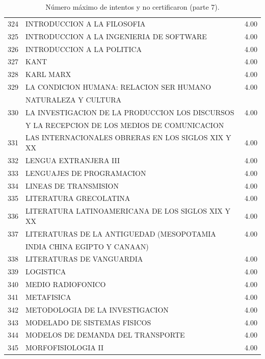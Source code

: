 \documentclass[12pt]{article}
\begin{document}
\begin{table}[ht]
{\begin{tabular}{rlr}
  324 & INTRODUCCION A LA FILOSOFIA & 4.00 \\ 
  325 & INTRODUCCION A LA INGENIERIA DE SOFTWARE & 4.00 \\ 
  326 & INTRODUCCION A LA POLITICA & 4.00 \\ 
  327 & KANT & 4.00 \\ 
  328 & KARL MARX & 4.00 \\ 
  329 & LA CONDICION HUMANA: RELACION SER HUMANO& 4.00 \\
   & NATURALEZA Y CULTURA & \\ 
  330 & LA INVESTIGACION DE LA PRODUCCION LOS DISCURSOS & 4.00 \\ 
  &  Y LA RECEPCION DE LOS MEDIOS DE COMUNICACION &  \\ 
  331 & LAS INTERNACIONALES OBRERAS EN LOS SIGLOS XIX Y XX & 4.00 \\ 
  332 & LENGUA EXTRANJERA III & 4.00 \\ 
  333 & LENGUAJES DE PROGRAMACION & 4.00 \\ 
  334 & LINEAS DE TRANSMISION & 4.00 \\ 
  335 & LITERATURA GRECOLATINA & 4.00 \\ 
  336 & LITERATURA LATINOAMERICANA DE LOS SIGLOS XIX Y XX & 4.00 \\ 
  337 & LITERATURAS DE LA ANTIGUEDAD (MESOPOTAMIA & 4.00 \\ 
   &  INDIA CHINA EGIPTO Y CANAAN) & \\ 
  338 & LITERATURAS DE VANGUARDIA & 4.00 \\ 
  339 & LOGISTICA & 4.00 \\ 
  340 & MEDIO RADIOFONICO & 4.00 \\ 
  341 & METAFISICA & 4.00 \\ 
  342 & METODOLOGIA DE LA INVESTIGACION & 4.00 \\ 
  343 & MODELADO DE SISTEMAS FISICOS & 4.00 \\ 
  344 & MODELOS DE DEMANDA DEL TRANSPORTE & 4.00 \\ 
  345 & MORFOFISIOLOGIA II & 4.00 \\ 
   \hline
\end{tabular}
}\caption{\label{Num_Max_Intentos_Nunca_Cert_7} N\'umero m\'aximo de intentos y no certificaron (parte 7).}
\end{table}
\end{document}
